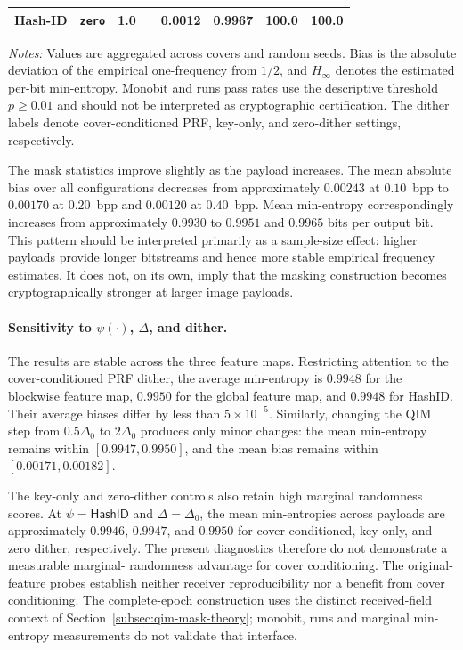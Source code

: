\documentclass[journal]{IEEEtran}
\theoremstyle{definition}
\theoremstyle{game}
\begin{document}
\begin{table}[!t]
\begin{threeparttable}
\begin{tabular}{@{}llc c S[table-format=1.4] S[table-format=1.4] c c@{}}
Hash-ID & \texttt{zero} & 1.0 &  & 0.0012 & 0.9967 & 100.0 & 100.0 \\
\bottomrule
\end{tabular}
\begin{tablenotes}
\footnotesize
\item \textit{Notes:} Values are aggregated across covers and random seeds. Bias is the absolute deviation of the empirical one-frequency from $1/2$, and $H_{\infty}$ denotes the estimated per-bit min-entropy. Monobit and runs pass rates use the descriptive threshold $p\geq 0.01$ and should not be interpreted as cryptographic certification. The dither labels denote cover-conditioned PRF, key-only, and zero-dither settings, respectively.
\end{tablenotes}
\end{threeparttable}
\end{table}

The mask statistics improve slightly as the payload increases. The mean
absolute bias over all configurations decreases from approximately $0.00243$
at $0.10$~bpp to $0.00170$ at $0.20$~bpp and $0.00120$ at $0.40$~bpp. Mean
min-entropy correspondingly increases from approximately $0.9930$ to $0.9951$
and $0.9965$ bits per output bit. This pattern should be interpreted primarily
as a sample-size effect: higher payloads provide longer bitstreams and hence
more stable empirical frequency estimates. It does not, on its own, imply that
the masking construction becomes cryptographically stronger at larger image
payloads.

\paragraph{Sensitivity to $\psi(\cdot)$, $\Delta$, and dither.}
The results are stable across the three feature maps. Restricting attention to
the cover-conditioned PRF dither, the average min-entropy is $0.9948$ for the
blockwise feature map, $0.9950$ for the global feature map, and $0.9948$ for
\textsf{HashID}. Their average biases differ by less than $5\times10^{-5}$.
Similarly, changing the QIM step from $0.5\Delta_0$ to $2\Delta_0$ produces
only minor changes: the mean min-entropy remains within
$[0.9947,0.9950]$, and the mean bias remains within
$[0.00171,0.00182]$.

The key-only and zero-dither controls also retain high marginal randomness
scores. At $\psi=\textsf{HashID}$ and $\Delta=\Delta_0$, the mean
min-entropies across payloads are approximately $0.9946$, $0.9947$, and
$0.9950$ for cover-conditioned, key-only, and zero dither, respectively. The
present diagnostics therefore do not demonstrate a measurable marginal-
randomness advantage for cover conditioning. The original-feature probes establish neither receiver reproducibility
nor a benefit from cover conditioning. The complete-epoch construction
uses the distinct received-field context of
Section~\ref{subsec:qim-mask-theory}; monobit, runs and marginal
min-entropy measurements do not validate that interface.
\end{document}

